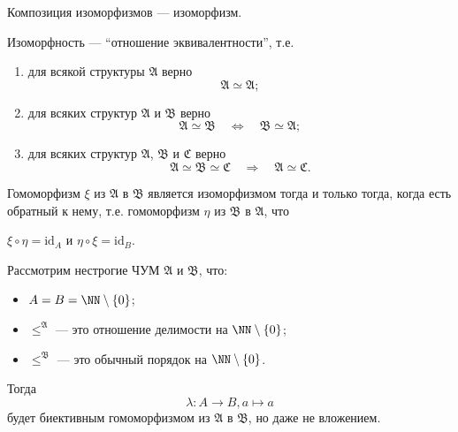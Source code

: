 \documentclass[12pt,a4paper]{article}
\newcommand{\id}{\ensuremath{\mathrm{id}}\xspace}
\begin{document}
    \begin{lemma}
        Композиция изоморфизмов --- изоморфизм.
    \end{lemma}

    \begin{lemma}
        Изоморфность --- ``отношение эквивалентности'', т.е.
        \begin{enumerate}
            \item для всякой структуры $\mathfrak{A}$ верно
                \[\mathfrak{A} \simeq \mathfrak{A};\]
            \item для всяких структур $\mathfrak{A}$ и $\mathfrak{B}$ верно
                \[\mathfrak{A} \simeq \mathfrak{B} \quad \Longleftrightarrow \quad \mathfrak{B} \simeq \mathfrak{A};\]
            \item для всяких структур $\mathfrak{A}$, $\mathfrak{B}$ и $\mathfrak{C}$ верно
                \[\mathfrak{A} \simeq \mathfrak{B} \simeq \mathfrak{C} \quad \Longrightarrow \quad \mathfrak{A} \simeq \mathfrak{C}.\]
        \end{enumerate}
    \end{lemma}

    \begin{lemma}
        Гомоморфизм $\xi$ из $\mathfrak{A}$ в $\mathfrak{B}$ является изоморфизмом тогда и только тогда, когда есть обратный к нему, т.е. гомоморфизм $\eta$ из $\mathfrak{B}$ в $\mathfrak{A}$, что
        \begin{center}
            $\xi \circ \eta = \id_A$ \quad и \quad $\eta \circ \xi = \id_B$.
        \end{center}
    \end{lemma}

    \begin{example}
        Рассмотрим нестрогие ЧУМ $\mathfrak{A}$ и $\mathfrak{B}$, что:
        \begin{itemize}
            \item $A = B = \NN \setminus \{0\}$;
            \item ${\leqslant}^\mathfrak{A}$ --- это отношение делимости на $\NN \setminus \{0\}$;
            \item ${\leqslant}^\mathfrak{B}$ --- это обычный порядок на $\NN \setminus \{0\}$.
        \end{itemize}
        Тогда
        \[\lambda: A \to B, a \mapsto a\]
        будет биективным гомоморфизмом из $\mathfrak{A}$ в $\mathfrak{B}$, но даже не вложением.
    \end{example}
\end{document}
